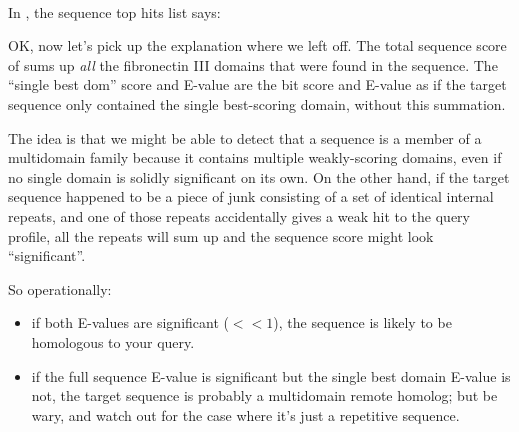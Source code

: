    \vspace{1ex}
    \\
   \vspace{1ex}

In , the sequence top hits list says:


OK, now let's pick up the explanation where we left off. The total
sequence score of \SFSbitscore{} sums up \emph{all} the fibronectin III domains
that were found in the  sequence. The ``single best
dom'' score and E-value are the bit score and E-value as if the target
sequence only contained the single best-scoring domain, without this
summation.

The idea is that we might be able to detect that a sequence is a
member of a multidomain family because it contains multiple
weakly-scoring domains, even if no single domain is solidly
significant on its own.  On the other hand, if the target sequence
happened to be a piece of junk consisting of a set of identical
internal repeats, and one of those repeats accidentally gives a weak
hit to the query profile, all the repeats will sum up and the sequence
score might look ``significant''.

So operationally:
\begin{itemize}
\item if both E-values are significant ($<<1$), the sequence is likely
      to be homologous to your query.
\item if the full sequence E-value is significant but the single best domain
      E-value is not, the target sequence is probably a multidomain remote 
      homolog; but be wary, and watch out for the case where it's just a repetitive
      sequence.
\end{itemize}


